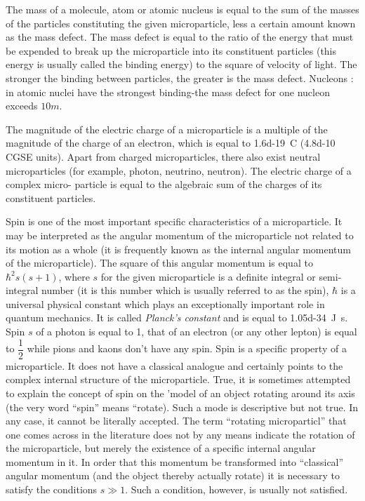 \documentclass[a4paper,sfsidenotes,colorlinks=true]{tufte-book}
\numberwithin{equation}{section}
\numberwithin{figure}{section}
\begin{document}
The mass of a molecule, atom or atomic nucleus is equal to the sum of the masses of the particles constituting the given microparticle, less a certain amount known as the mass defect. The mass defect is equal to the ratio of the energy that must be expended to break up the microparticle into its constituent particles (this energy is usually called the binding energy) to the square of velocity of light. The stronger the binding between particles, the greater is the mass defect. Nucleons : in atomic nuclei have the strongest binding-the mass defect for one nucleon exceeds $10m$.

The magnitude of the electric charge of a microparticle is a multiple of the magnitude of the charge of an electron, which is equal to \SI{1.6d-19}{\coulomb} (\num{4.8d-10} CGSE units). Apart from charged microparticles, there also exist neutral microparticles (for example, photon, neutrino, neutron). The electric charge of a complex micro- particle is equal to the algebraic sum of the charges of its constituent particles.

Spin is one of the most important
specific characteristics of a microparticle. It may be interpreted as
the angular momentum of the microparticle not related to its motion as
a whole (it is frequently known as the internal angular momentum of
the microparticle). The square of this angular momentum is equal to
$\hbar^{2}s (s + 1)$, where $s$ for the given microparticle is a
definite integral or semi-integral number (it is this number which is
usually referred to as the spin), $\hbar$ is a universal physical
constant which plays an exceptionally important role in quantum
mechanics. It is called \emph{Planck's constant} and is equal to
\SI{1.05d-34}{ \joule\second}. Spin $s$ of a photon is equal to 1,
that of an electron (or any other lepton) is equal to $\dfrac{1}{2}$
while pions and kaons don't have any spin. 
Spin is a specific property of a microparticle. It does not have a
classical analogue and certainly points to the complex internal
structure of the microparticle. True, it is sometimes attempted to
explain the concept of spin on the 'model of an object rotating around
its axis (the very word ``spin'' means ``rotate). Such a mode is
descriptive but not true. In any case, it cannot be literally
accepted. The term ``rotating microparticl'' that one comes across in
the literature does not by any means indicate the rotation of the
microparticle, but merely the existence of a specific internal angular
momentum in it. In order that this momentum be transformed into
``classical'' angular momentum (and the object thereby actually
rotate) it is necessary to satisfy the conditions $s \gg 1$. Such a
condition, however, is usually not satisfied.
\end{document}
